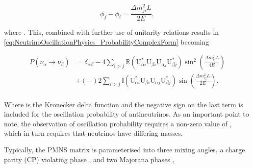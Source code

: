 \begin{equation}
  \phi_{j}-\phi_{i} = \frac{\Delta m^{2}_{ji} L}{2E},
\end{equation}

where . This, combined with further use of unitarity relations results in \autoref{eq:NeutrinoOscillationPhysics_ProbabilityComplexForm} becoming

\begin{equation}
  \label{eq:NeutrinoOscillationPhysics_ProbabilityComplexForm2}
  \begin{split}
    P(\nu_{\alpha} \rightarrow \nu_{\beta}) &= \delta_{\alpha \beta} - 4 \sum_{i>j} \mathbb{R} \left( \mathrm{U}^{*}_{\alpha i}\mathrm{U}_{\beta i}\mathrm{U}_{\alpha j}\mathrm{U}^{*}_{\beta j} \right) \sin^{2} \left( \frac{\Delta m^{2}_{ij} L}{4E} \right) \\
    & + \left( - \right) 2 \sum_{i>j} \mathbb{I} \left( \mathrm{U}^{*}_{\alpha i}\mathrm{U}_{\beta i}\mathrm{U}_{\alpha j}\mathrm{U}^{*}_{\beta j} \right) \sin \left( \frac{\Delta m^{2}_{ij} L}{2E} \right). \\
    \end{split}
\end{equation}

Where \quickmath{\delta_{\alpha \beta}} is the Kronecker delta function and the negative sign on the last term is included for the oscillation probability of antineutrinos. As an important point to note, the observation of oscillation probability requires a non-zero value of , which in turn requires that neutrinos have differing masses.

Typically, the PMNS matrix is parameterised into three mixing angles, a charge parity (CP) violating phase , and two Majorana phases ,

